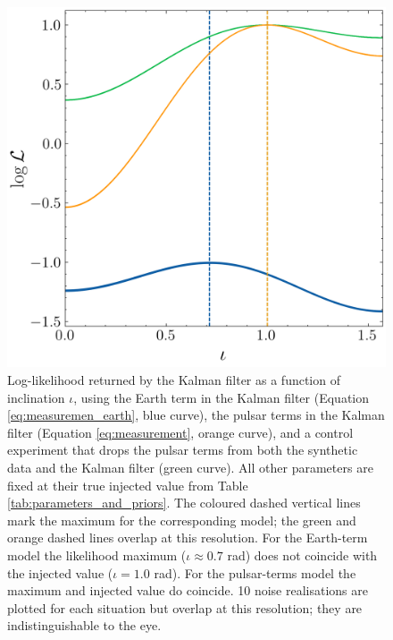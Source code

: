 \documentclass[fleqn,usenatbib,useAMS]{mnras}
\begin{document}
\begin{figure}
	\centering
	\includegraphics[width=\columnwidth]{images/likelihood_iota_new}
	\caption{Log-likelihood returned by the Kalman filter as a function of inclination $\iota$, using the Earth term in the Kalman filter (Equation \ref{eq:measuremen_earth}, blue curve), the pulsar terms in the Kalman filter (Equation \ref{eq:measurement}, orange curve), and a control experiment that drops the pulsar terms from both the synthetic data and the Kalman filter (green curve). All other parameters are fixed at their true injected value from Table \ref{tab:parameters_and_priors}. The coloured dashed vertical lines mark the maximum for the corresponding model; the green and orange dashed lines overlap at this resolution. For the Earth-term model the likelihood maximum ($\iota \approx 0.7$ rad) does not coincide with the injected value ($\iota = 1.0$ rad). For the pulsar-terms model the maximum and injected value do coincide. 10 noise realisations are plotted for each situation but overlap at this resolution; they are indistinguishable to the eye.}
	\label{fig:likelihood_surface_iota}
\end{figure}
\end{document}

